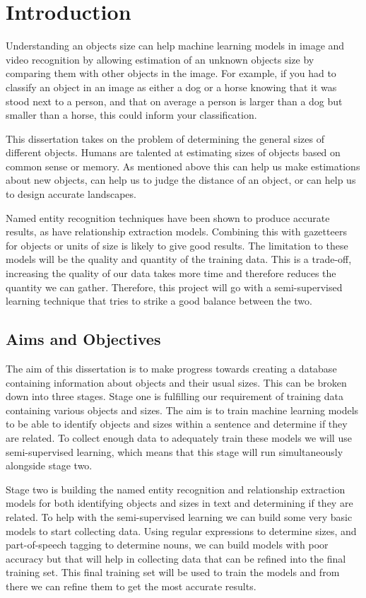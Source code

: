 \chapter{Introduction}

Understanding an objects size can help machine learning models in image and video recognition by allowing estimation of an unknown objects size by comparing them with other objects in the image. For example, if you had to classify an object in an image as either a dog or a horse knowing that it was stood next to a person, and that on average a person is larger than a dog but smaller than a horse, this could inform your classification.

This dissertation takes on the problem of determining the general sizes of different objects. Humans are talented at estimating sizes of objects based on common sense or memory. As mentioned above this can help us make estimations about new objects, can help us to judge the distance of an object, or can help us to design accurate landscapes.

Named entity recognition techniques have been shown to produce accurate results, as have relationship extraction models. Combining this with gazetteers for objects or units of size is likely to give good results. The limitation to these models will be the quality and quantity of the training data. This is a trade-off, increasing the quality of our data takes more time and therefore reduces the quantity we can gather. Therefore, this project will go with a semi-supervised learning technique that tries to strike a good balance between the two. 

\section{Aims and Objectives}

The aim of this dissertation is to make progress towards creating a database containing information about objects and their usual sizes. This can be broken down into three stages. Stage one is fulfilling our requirement of training data containing various objects and sizes. The aim is to train machine learning models to be able to identify objects and sizes within a sentence and determine if they are related. To collect enough data to adequately train these models we will use semi-supervised learning, which means that this stage will run simultaneously alongside stage two.

Stage two is building the named entity recognition and relationship extraction models for both identifying objects and sizes in text and determining if they are related. To help with the semi-supervised learning we can build some very basic models to start collecting data. Using regular expressions to determine sizes, and part-of-speech tagging to determine nouns, we can build models with poor accuracy but that will help in collecting data that can be refined into the final training set. This final training set will be used to train the models and from there we can refine them to get the most accurate results.

